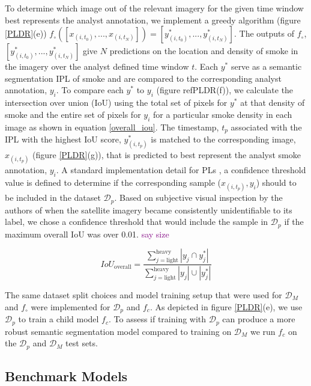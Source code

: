 \documentclass{article}
\newcommand\reynotes[1]{\textcolor{purple}{#1}}
\begin{document}
To determine which image out of the relevant imagery for the given time window best represents the analyst annotation, we implement a greedy algorithm (figure \ref{PLDR}(e)) \(f_\circ([x_{(i,t_0)},...,x_{(i,t_N)}])=[y^*_{(i,t_0)},...,y^*_{(i,t_N)}]\). The outputs of \(f_{\circ}\), \([y^*_{(i,t_0)},...,y^*_{(i,t_N)}]\) give \(N\) predictions on the location and density of smoke in the imagery over the analyst defined time window \(t\). Each \(y^*\) serve as a semantic segmentation IPL of smoke and are compared to the corresponding analyst annotation, \(y_i\). To compare each \(y^*\) to \(y_i\) (figure ref{PLDR}(f)), we calculate the intersection over union (IoU) using the total set of pixels for \(y^*\) at that density of smoke and the entire set of pixels for \(y_i\) for a particular smoke density in each image as shown in equation \ref{overall_iou}. The timestamp, \(t_p\) associated with the IPL with the highest IoU score, \(y^*_{(i,t_p)}\) is matched to the corresponding image, \(x_{(i,t_p)}\) (figure \ref{PLDR}(g)), that is predicted to best represent the analyst smoke annotation, \(y_i\). A standard implementation detail for PLs \cite{conf_thresh}, a confidence threshold value is defined to determine if the corresponding sample (\(x_{(i, t_p)}, y_i\)) should to be included in the dataset \(\mathcal{D}_p\). Based on subjective visual inspection by the authors of when the satellite imagery became consistently unidentifiable to its label, we chose a confidence threshold that would include the sample in \(\mathcal{D}_{p}\) if the maximum overall IoU was over 0.01. 
\reynotes{say size}

\begin{equation} \label{overall_iou}
    IoU_{\text{overall}} = \frac{\sum\limits_{j=\text{light}}^{\text{heavy}}|y_{j}\cap y^*_{j}|}{\sum\limits_{j=\text{light}}^{\text{heavy}}|y_{j}|\cup|y^*_{j}|}
\end{equation}



The same dataset split choices and model training setup that were used for \(\mathcal{D}_{M}\) and \(f_{\circ}\) were implemented for \(\mathcal{D}_p\) and \(f_c\). As depicted in figure \ref{PLDR}(e), we use \(\mathcal{D}_{p}\) to train a child model \(f_c\). To assess if training with \(\mathcal{D}_{p}\) can produce a more robust semantic segmentation model compared to training on \(\mathcal{D}_M\) we run \(f_c\) on the \(\mathcal{D}_{p}\) and \(\mathcal{D}_{M}\) test sets. 

\subsection{Benchmark Models}
\end{document}

